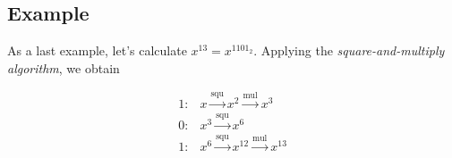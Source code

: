 \subsection{Example}

As a last example, let's calculate $x^{13} = x^{1101_2}$. Applying the \emph{square-and-multiply algorithm}, we obtain

\begin{align*}
1: & x \xrightarrow{\text{squ}} x^2 \xrightarrow{\text{mul}} x^3 \\
0: & x^3 \xrightarrow{\text{squ}} x^6 \\
1: & x^6 \xrightarrow{\text{squ}} x^{12} \xrightarrow{\text{mul}} x^{13}
\end{align*}



